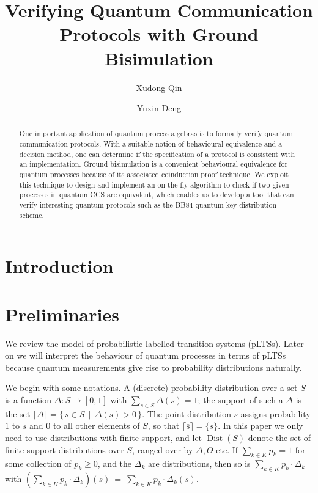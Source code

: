 \documentclass[a4paper,UKenglish,cleveref, autoref]{lipics-v2019}
\title{Verifying Quantum Communication Protocols with Ground Bisimulation}
\author{Xudong Qin}{Shanghai Key Laboratory of Trustworthy Computing, East China Normal University, China}{marsxd@gmail.com}{}{}
\author{Yuxin Deng}{Shanghai Key Laboratory of Trustworthy Computing, East China Normal University, China}{yxdeng@sei.ecnu.edu.cn}{}{}
\newcommand{\dist}[1]{\mathop{Dist} ({#1})   } %
\newcommand{\pdist}[1]{\overline{#1}  } %
\newcommand{\support}[1]{\lceil{#1}\rceil}
\newcommand{\setof}[2]{\{ \, #1 \, \mid \, #2 \, \}}%
\begin{document}
\maketitle

\begin{abstract}
	
One important application of quantum process algebras is to formally verify quantum communication protocols. With a suitable notion of behavioural equivalence and a decision method, one can determine if the specification of a protocol is consistent with an implementation. Ground bisimulation is a convenient behavioural equivalence for quantum processes because of its associated coinduction proof technique. We exploit this technique to design and implement an on-the-fly algorithm to check if two given processes in quantum CCS are equivalent, which enables us to develop a tool that can verify interesting quantum protocols such as the BB84 quantum key distribution scheme.
\end{abstract}

\section{Introduction}
\label{sec:introduction}

\section{Preliminaries}
\label{sec:plts}
We review the model of probabilistic labelled
transition systems (pLTSs). Later on we will interpret the behaviour
of quantum processes in terms of pLTSs because quantum measurements give rise to probability distributions naturally.

We begin with some notations. A (discrete) probability distribution
over a set $S$ is a function $\Delta : S \rightarrow [0, 1] $ with
$\sum_{s\in S} \Delta(s) = 1$; the support of such a $\Delta$ is
the set $\support{\Delta} = \setof{s \in S}{\Delta(s) > 0}$.
The point distribution $\pdist{s}$ assigns probability
$1$ to $s$ and $0$ to all other elements of $S$, so that
$\support{\pdist{s}} = \{s\}$. In this paper we only need to use distributions with finite support, and let $\dist{S}$ denote the set of
finite support distributions over $S$, ranged over by $\Delta,\Theta$ etc.
If $\sum_{k \in K} p_k = 1$ for some
collection of  $p_k \geq 0$, and the $\Delta_k$ are distributions,
then so is $\sum_{k \in K}p_k \cdot \Delta_k$ with
$(\sum_{k \in K}p_k \cdot \Delta_k)(s)~=~\sum_{k\in K} p_k\cdot \Delta_k(s).$
\end{document}
